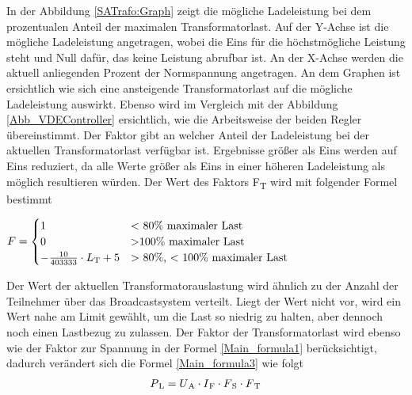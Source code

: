 In der Abbildung \ref{SATrafo:Graph} zeigt die mögliche Ladeleistung bei dem prozentualen Anteil der maximalen Transformatorlast. Auf der Y-Achse ist die mögliche Ladeleistung angetragen, wobei die Eins für die höchstmögliche Leistung steht und Null dafür, das keine Leistung abrufbar ist. An der X-Achse werden die aktuell anliegenden Prozent der Normspannung angetragen. An dem Graphen ist ersichtlich wie sich eine ansteigende Transformatorlast auf die mögliche Ladeleistung auswirkt. Ebenso wird im Vergleich mit der Abbildung \ref{Abb_VDEController} ersichtlich, wie die Arbeitsweise der beiden Regler übereinstimmt. Der Faktor gibt an welcher Anteil der Ladeleistung bei der aktuellen Transformatorlast verfügbar ist. Ergebnisse größer als Eins werden auf Eins reduziert, da alle Werte größer als Eins in einer höheren Ladeleistung als möglich resultieren würden. Der Wert des Faktors F\textsubscript{T} wird mit folgender Formel bestimmt \\
\begin{center}
	$ F = \begin{cases}
	1 &  \text{$<$ 80\% maximaler Last} \\
	0 &  \text{$>$100\% maximaler Last} \\
	- \frac{10}{403333} \cdot L\textsubscript{T} + 5 & \text{$>$ 80\%, $<$ 100\% maximaler Last}
	\end{cases}$
\end{center}
Der Wert der aktuellen Transformatorauslastung wird ähnlich zu der Anzahl der Teilnehmer über das Broadcastsystem verteilt. Liegt der Wert nicht vor, wird ein Wert nahe am Limit gewählt, um die Last so niedrig zu halten, aber dennoch noch einen Lastbezug zu zulassen. Der Faktor der Transformatorlast wird ebenso wie der Faktor zur Spannung in der Formel \ref{Main_formula1} berücksichtigt, dadurch verändert sich die Formel \ref{Main_formula3} wie folgt
\begin{align}
	P\textsubscript{L} = U\textsubscript{A} \cdot I\textsubscript{F} \cdot F\textsubscript{S} \cdot F\textsubscript{T} \label{Main_formula4}
\end{align}
